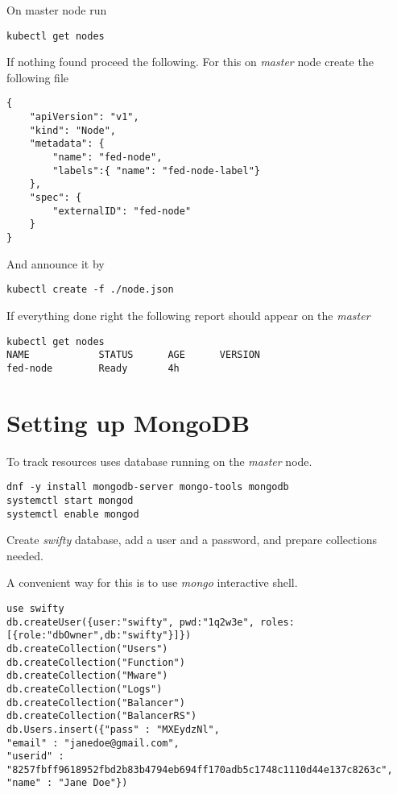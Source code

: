 On master node run

\begin{lstlisting}
kubectl get nodes
\end{lstlisting}

If nothing found proceed the following. For this on
\emph{master} node create the following 
file

\begin{lstlisting}
{
    "apiVersion": "v1",
    "kind": "Node",
    "metadata": {
        "name": "fed-node",
        "labels":{ "name": "fed-node-label"}
    },
    "spec": {
        "externalID": "fed-node"
    }
}
\end{lstlisting}

And announce it by
\begin{lstlisting}
kubectl create -f ./node.json
\end{lstlisting}

If everything done right the following report should
appear on the \emph{master} 

\begin{lstlisting}
kubectl get nodes
NAME            STATUS      AGE      VERSION
fed-node        Ready       4h
\end{lstlisting}

\section{Setting up MongoDB}
\label{sec:setup-mongodb}

To track resources  uses
 database
running on the \emph{master} node.

\begin{lstlisting}
dnf -y install mongodb-server mongo-tools mongodb
systemctl start mongod
systemctl enable mongod
\end{lstlisting}

Create \emph{swifty} database, add a user and a password,
and prepare collections needed.

A convenient way for this is to use \emph{mongo} interactive shell.

\begin{lstlisting}
use swifty
db.createUser({user:"swifty", pwd:"1q2w3e", roles:[{role:"dbOwner",db:"swifty"}]})
db.createCollection("Users")
db.createCollection("Function")
db.createCollection("Mware")
db.createCollection("Logs")
db.createCollection("Balancer")
db.createCollection("BalancerRS")
db.Users.insert({"pass" : "MXEydzNl",
"email" : "janedoe@gmail.com",
"userid" : "8257fbff9618952fbd2b83b4794eb694ff170adb5c1748c1110d44e137c8263c",
"name" : "Jane Doe"})
\end{lstlisting}

